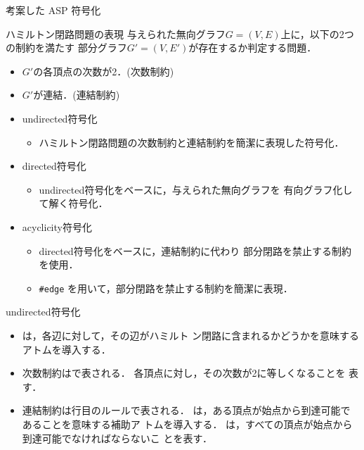 \documentclass[dvipdfmx,10pt]{beamer}
\begin{document}
\begin{frame}{考案した ASP 符号化}
  \begin{block}{ハミルトン閉路問題の表現}
    与えられた無向グラフ$G= (V,E)$上に，以下の2つの制約を満たす
    部分グラフ$G'= (V,E')$が存在するか判定する問題．
    \begin{itemize}
    \item $G'$の各頂点の次数が2．(\alert{次数制約})
    \item $G'$が連結．(\alert{連結制約})
    \end{itemize}
  \end{block}
  \begin{itemize}
  \item \alert{\textsf{undirected}符号化}
    \begin{itemize}
    \item ハミルトン閉路問題の次数制約と連結制約を簡潔に表現した符号化．
    \end{itemize}
  \item \alert{\textsf{directed}符号化}
    \begin{itemize}
    \item \textsf{undirected}符号化をベースに，与えられた無向グラフを
      有向グラフ化して解く符号化．
    \end{itemize}
  \item \alert{\textsf{acyclicity}符号化}
    \begin{itemize}
    \item \textsf{directed}符号化をベースに，連結制約に代わり
      部分閉路を禁止する制約を使用．
      \item \texttt{\#edge} を用いて，部分閉路を禁止する制約を簡潔に表現．
    \end{itemize}
  \end{itemize}
\end{frame}
\begin{frame}{\textsf{undirected}符号化}
\begin{exampleblock}{}

\end{exampleblock}
\begin{itemize}
\item {}は，各辺に対して，その辺がハミルト
      ン閉路に含まれるかどうかを意味するアトムを導入する．
\item 次数制約はで表される．
      各頂点に対し，その次数が2に等しくなることを
      表す．
\item 連結制約は行目のルールで表される．
      は，ある頂点が始点から到達可能であることを意味する補助ア
      トムを導入する．
      は，すべての頂点が始点から到達可能でなければならないこ
      とを表す．
\end{itemize}
\end{frame}
\end{document}
